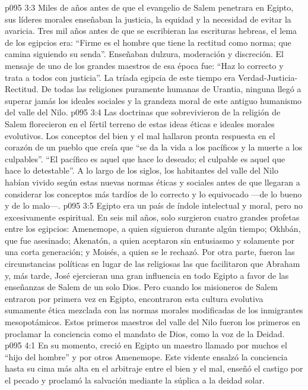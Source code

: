\vs p095 3:3 Miles de años antes de que el evangelio de Salem penetrara en Egipto, sus líderes morales enseñaban la justicia, la equidad y la necesidad de evitar la avaricia. Tres mil años antes de que se escribieran las escrituras hebreas, el lema de los egipcios era: “Firme es el hombre que tiene la rectitud como norma; que camina siguiendo su senda”. Enseñaban dulzura, moderación y discreción. El mensaje de uno de los grandes maestros de esa época fue: “Haz lo correcto y trata a todos con justicia”. La tríada egipcia de este tiempo era Verdad\hyp{}Justicia\hyp{}Rectitud. De todas las religiones puramente humanas de Urantia, ninguna llegó a superar jamás los ideales sociales y la grandeza moral de este antiguo humanismo del valle del Nilo.
\vs p095 3:4 Las doctrinas que sobrevivieron de la religión de Salem florecieron en el fértil terreno de estas ideas éticas e ideales morales evolutivos. Los conceptos del bien y el mal hallaron pronta respuesta en el corazón de un pueblo que creía que “se da la vida a los pacíficos y la muerte a los culpables”. “El pacífico es aquel que hace lo deseado; el culpable es aquel que hace lo detestable”. A lo largo de los siglos, los habitantes del valle del Nilo habían vivido según estas nuevas normas éticas y sociales antes de que llegaran a considerar los conceptos más tardíos de lo correcto y lo equivocado ---de lo bueno y de lo malo---.
\vs p095 3:5 \pc Egipto era un país de índole intelectual y moral, pero no excesivamente espiritual. En seis mil años, solo surgieron cuatro grandes profetas entre los egipcios: Amenemope, a quien siguieron durante algún tiempo; Okhbán, que fue asesinado; Akenatón, a quien aceptaron sin entusiasmo y solamente por una corta generación; y Moisés, a quien se le rechazó. Por otra parte, fueron las circunstancias políticas en lugar de las religiosas las que facilitaron que Abraham y, más tarde, José ejercieran una gran influencia en todo Egipto a favor de las enseñanzas de Salem de un solo Dios. Pero cuando los misioneros de Salem entraron por primera vez en Egipto, encontraron esta cultura evolutiva sumamente ética mezclada con las normas morales modificadas de los inmigrantes mesopotámicos. Estos primeros maestros del valle del Nilo fueron los primeros en proclamar la conciencia como el mandato de Dios, como la voz de la Deidad.
\vs p095 4:1 En su momento, creció en Egipto un maestro llamado por muchos el “hijo del hombre” y por otros Amenemope. Este vidente ensalzó la conciencia hasta su cima más alta en el arbitraje entre el bien y el mal, enseñó el castigo por el pecado y proclamó la salvación mediante la súplica a la deidad solar.
